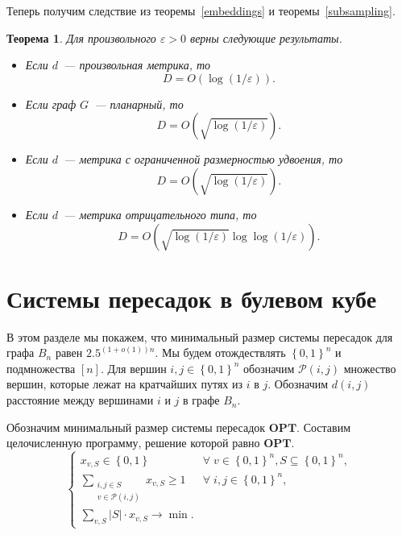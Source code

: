 \documentclass[12pt]{article}
\newcommand{\eps}{\varepsilon}
\newcommand{\set}[1]{\left\{#1\right\}}
\newcommand{\zo}{\set{0, 1}}
\newcommand{\Pc}{\mathcal{P}}
\newtheorem{theorem}{Теорема}
\begin{document}
    Теперь получим следствие из теоремы~\ref{embeddings} и теоремы~\ref{subsampling}.
    \begin{theorem}
        Для произвольного $\eps > 0$ верны следующие результаты.
        \begin{itemize}
            \item
            Если $d$~--- произвольная метрика, то 
            $$
                D = O(\log (1 / \eps)).
            $$
            \item
            Если граф $G$~--- планарный, то
            $$
                D = O\left(\sqrt{\log (1 / \eps)}\right).
            $$
            \item
            Если $d$~--- метрика с ограниченной размерностью удвоения, то
            $$
                D = O\left(\sqrt{\log (1 / \eps)}\right).
            $$
            \item
            Если $d$~--- метрика отрицательного типа, то
            $$
                D = O\left(\sqrt{\log (1 / \eps)} \log \log (1 / \eps)\right).
            $$
        \end{itemize}
    \end{theorem}
    \section{Системы пересадок в булевом кубе}
    \label{section_hub_labels}
    В этом разделе мы покажем, что минимальный размер системы пересадок для графа $B_n$ равен $2.5^{(1+o(1))n}$.
    Мы будем отождествлять $\zo^n$ и подмножества $[n]$.
    Для вершин $i, j \in \zo^n$ обозначим $\Pc(i, j)$ множество вершин, которые лежат
    на кратчайших путях из $i$ в $j$. Обозначим $d(i, j)$ расстояние между вершинами $i$ и $j$ в графе $B_n$.

    Обозначим минимальный размер
    системы пересадок $\mathbf{OPT}$.
    Составим целочисленную программу, решение которой равно $\mathbf{OPT}$.
    \begin{equation}
        \label{ilp}
        \begin{cases}
            x_{v,S} \in \zo & \forall \; v \in \zo^n, S \subseteq \zo^n, \\ 
            \sum_{\begin{smallmatrix}i, j \in S \\ v \in \Pc(i, j)\end{smallmatrix}} x_{v,S} \geq 1 & \forall \; i, j \in \zo^n, \\
            \sum_{v,S} |S| \cdot x_{v,S} \to \min.
        \end{cases}
    \end{equation}
\end{document}
